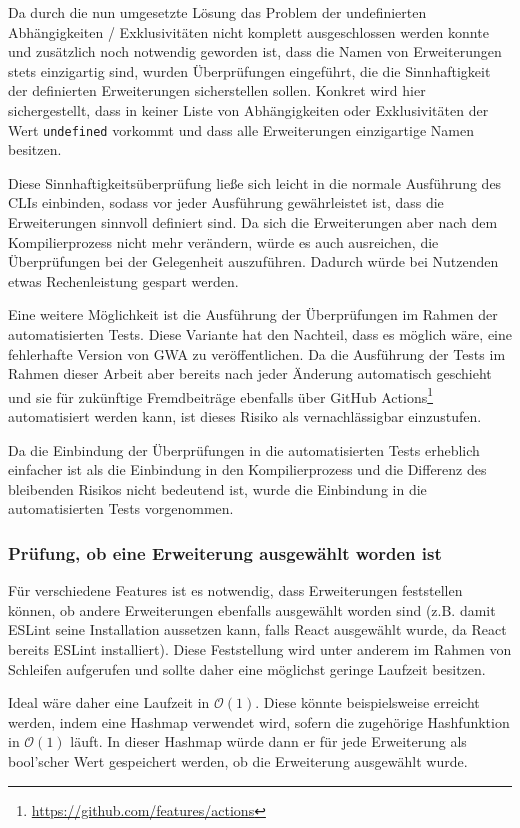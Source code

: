 Da durch die nun umgesetzte Lösung das Problem der undefinierten Abhängigkeiten / Exklusivitäten nicht komplett ausgeschlossen werden konnte und zusätzlich noch notwendig geworden ist, dass die Namen von Erweiterungen stets einzigartig sind, wurden Überprüfungen eingeführt, die die Sinnhaftigkeit der definierten Erweiterungen sicherstellen sollen. Konkret wird hier sichergestellt, dass in keiner Liste von Abhängigkeiten oder Exklusivitäten der Wert \verb|undefined| vorkommt und dass alle Erweiterungen einzigartige Namen besitzen.

Diese Sinnhaftigkeitsüberprüfung ließe sich leicht in die normale Ausführung des \gls{CLI}s einbinden, sodass vor jeder Ausführung gewährleistet ist, dass die Erweiterungen sinnvoll definiert sind. Da sich die Erweiterungen aber nach dem Kompilierprozess nicht mehr verändern, würde es auch ausreichen, die Überprüfungen bei der Gelegenheit auszuführen. Dadurch würde bei Nutzenden etwas Rechenleistung gespart werden.

Eine weitere Möglichkeit ist die Ausführung der Überprüfungen im Rahmen der automatisierten Tests. Diese Variante hat den Nachteil, dass es möglich wäre, eine fehlerhafte Version von \gls{GWA} zu veröffentlichen. Da die Ausführung der Tests im Rahmen dieser Arbeit aber bereits nach jeder Änderung automatisch geschieht und sie für zukünftige Fremdbeiträge ebenfalls über GitHub Actions\footnote{\url{https://github.com/features/actions}} automatisiert werden kann, ist dieses Risiko als vernachlässigbar einzustufen.

Da die Einbindung der Überprüfungen in die automatisierten Tests erheblich einfacher ist als die Einbindung in den Kompilierprozess und die Differenz des bleibenden Risikos nicht bedeutend ist, wurde die Einbindung in die automatisierten Tests vorgenommen.

\subsubsection{Prüfung, ob eine Erweiterung ausgewählt worden ist}
Für verschiedene Features ist es notwendig, dass Erweiterungen feststellen können, ob andere Erweiterungen ebenfalls ausgewählt worden sind (z.B. damit ESLint seine Installation aussetzen kann, falls React ausgewählt wurde, da React bereits ESLint installiert). Diese Feststellung wird unter anderem im Rahmen von Schleifen aufgerufen und sollte daher eine möglichst geringe Laufzeit besitzen.

Ideal wäre daher eine Laufzeit in $\mathcal{O}(1)$. Diese könnte beispielsweise erreicht werden, indem eine Hashmap verwendet wird, sofern die zugehörige Hashfunktion in $\mathcal{O}(1)$ läuft. In dieser Hashmap würde dann er für jede Erweiterung als bool'scher Wert gespeichert werden, ob die Erweiterung ausgewählt wurde.

